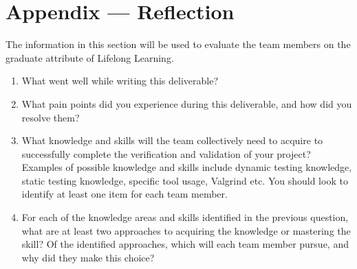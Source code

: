 \documentclass[12pt, titlepage]{article}
\begin{document}
\newpage{}

\section{Appendix --- Reflection}


The information in this section will be used to evaluate the team members on the
graduate attribute of Lifelong Learning.



\begin{enumerate}
  \item What went well while writing this deliverable? 
  \item What pain points did you experience during this deliverable, and how
    did you resolve them?
  \item What knowledge and skills will the team collectively need to acquire to
  successfully complete the verification and validation of your project?
  Examples of possible knowledge and skills include dynamic testing knowledge,
  static testing knowledge, specific tool usage, Valgrind etc.  You should look to
  identify at least one item for each team member.
  \item For each of the knowledge areas and skills identified in the previous
  question, what are at least two approaches to acquiring the knowledge or
  mastering the skill?  Of the identified approaches, which will each team
  member pursue, and why did they make this choice?
\end{enumerate}
\end{document}

